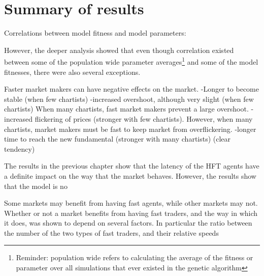 
\section{Summary of results}
Correlations between model fitness and model parameters:

However, the deeper analysis showed that even though correlation existed between some of the population wide parameter averages\footnote{Reminder: population wide refers to calculating the average of the fitness or parameter over all simulations that ever existed in the genetic algorithm} and some of the model fitnesses, there were also several exceptions.

Faster market makers can have negative effects on the market.
-Longer to become stable (when few chartists)
-increased overshoot, although very slight (when few chartists) When many chartists, fast market makers prevent a large overshoot.
-increased flickering of prices (stronger with few chartists). However, when many chartists, market makers must be fast to keep market from overflickering.
-longer time to reach the new fundamental (stronger with many chartists) (clear tendency)
\begin{comment}
\begin{figure}
\centering
\subcaptionbox{}[0.49\linewidth]{\texttt{[image: ]}}
\subcaptionbox{Experiment \dnine}[0.49\linewidth]{\texttt{[image: 103\_scatter\_manual\_outlier/d9/k.png]}}
\subcaptionbox{Experiment \dten}[0.49\linewidth]{\texttt{[image: 103\_scatter\_manual\_outlier/d10/h.png]}}
\subcaptionbox{Experiment \dten}[0.49\linewidth]{\texttt{[image: 103\_scatter\_manual\_outlier/d10/k.png]}}
\subcaptionbox{Experiment \deleven}[0.49\linewidth]{\texttt{[image: 103\_scatter\_manual\_outlier/d11/h.png]}}
\subcaptionbox{Experiment \deleven}[0.49\linewidth]{\texttt{[image: 103\_scatter\_manual\_outlier/d11/k.png]}}
\caption{Scatter plot of $\log \stdev$ against \timetoreachnewfundamental with coloring showing $\roundstable$ and \overshoot}
\label{figure:d9_scatter_fitness_inliers_b}
\end{figure}
\end{comment}




The results in the previous chapter show that the latency of the HFT agents have a definite impact on the way that the market behaves. However, the results show that the model is no

Some markets may benefit from having fast agents, while other markets may not. Whether or not a market benefits from having fast traders, and the way in which it does, was shown to depend on several factors. In particular the ratio between the number of the two types of fast traders, and their relative speeds 


